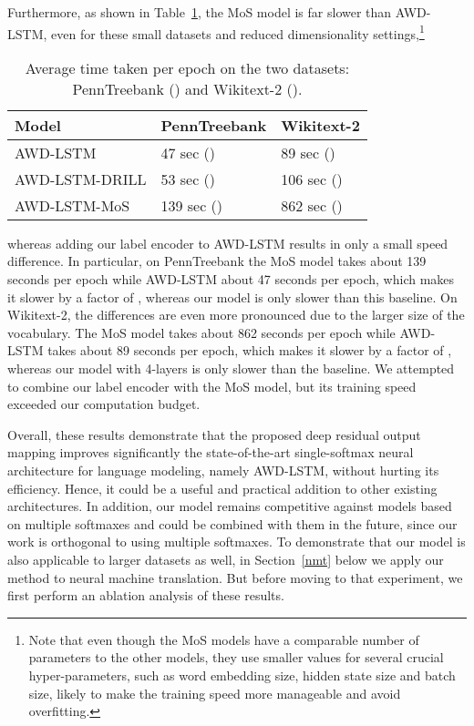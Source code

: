 \documentclass{article}
\begin{document}
Furthermore, as shown in Table~\ref{table:speed}, the MoS model is far slower than AWD-LSTM, even for these small datasets and reduced dimensionality settings,\footnote{
Note that even though the MoS models have a comparable number of parameters to the other models, they use smaller values for several crucial hyper-parameters, such as word embedding size, hidden state size and batch size, likely to make the training speed more manageable and avoid overfitting.  
}\begin{table}[htp]\centering
	\small
	 {\def\arraystretch{1.1}\tabcolsep=3.5pt\begin{tabular}{l|ll}
		\toprule
		\bf Model     & \bf PennTreebank &  \bf Wikitext-2 \\
		\midrule
		AWD-LSTM       & 47 sec () & 89 sec () \\
		AWD-LSTM-DRILL & 53 sec () & 106 sec () \\
		AWD-LSTM-MoS   & 139 sec () & 862 sec ()\\
 		\bottomrule
	\end{tabular}} 
	\vspace{-1mm}
	\caption{\small 
		Average time taken per epoch on the two datasets: PennTreebank () and Wikitext-2 (). 
	} 
	\vspace{-6mm}
	\label{table:speed}
\end{table}
whereas adding our label encoder to AWD-LSTM results in only a small speed difference. In particular, on PennTreebank the MoS model takes about 139 seconds per epoch while AWD-LSTM about 47 seconds per epoch, which makes it slower by a factor of , whereas our model is only  slower than this baseline.  On Wikitext-2, the differences are even more pronounced due to the larger size of the vocabulary.  The MoS model takes about 862 seconds per epoch while AWD-LSTM takes about 89 seconds per epoch, which makes it slower by a factor of , whereas our model with 4-layers is only  slower than the baseline. We attempted to combine our label encoder with the MoS model, but its training speed exceeded our computation budget. 

Overall, these results demonstrate that the proposed deep residual output mapping improves significantly the state-of-the-art single-softmax neural architecture for language modeling, namely AWD-LSTM, without hurting its efficiency.  Hence, it could be a useful and practical addition to other existing architectures. In addition, our model remains competitive against models based on multiple softmaxes and could be combined with them in the future, since our work is orthogonal to using multiple softmaxes. To demonstrate that our model is also applicable to larger datasets as well, in Section~\ref{nmt} below we apply our method to neural machine translation. But before moving to that experiment, we first perform an ablation analysis of these results. 
\end{document}
